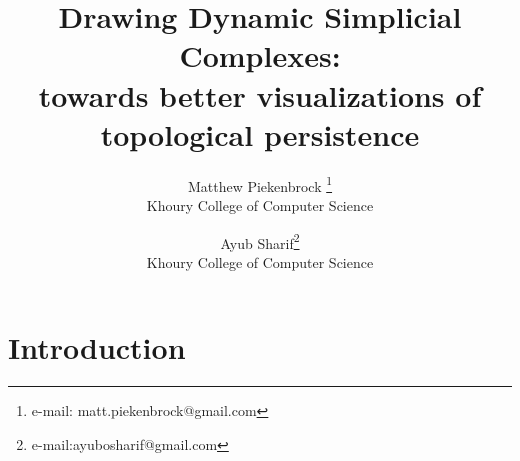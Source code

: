 \documentclass{vgtc}                          %
\title{Drawing Dynamic Simplicial Complexes: \\ towards better visualizations of topological persistence}
\author{Matthew Piekenbrock \thanks{e-mail: matt.piekenbrock@gmail.com}\\ %
        \scriptsize Khoury College of Computer Science  %
\and Ayub Sharif\thanks{e-mail:ayubosharif@gmail.com}\\ %
     \scriptsize Khoury College of Computer Science %
}
\begin{document}
\maketitle

\section{Introduction}


\end{document}
